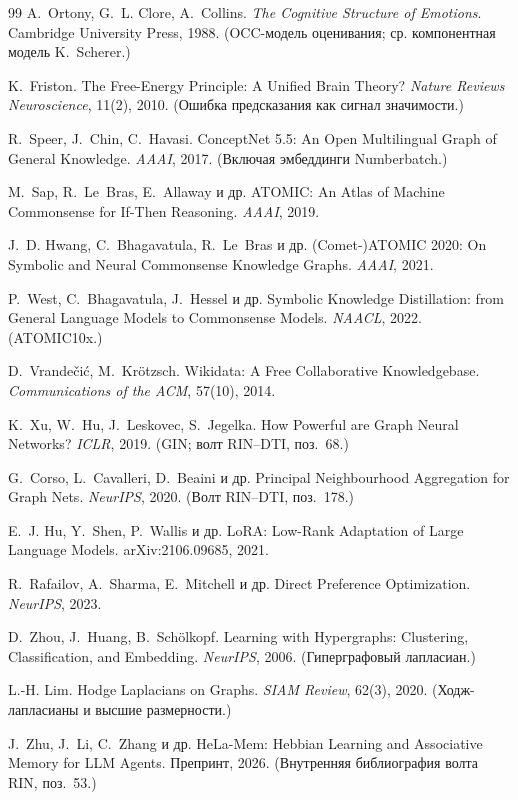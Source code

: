 \begin{thebibliography}{99}
 A.~Ortony, G.~L. Clore, A.~Collins.
\emph{The Cognitive Structure of Emotions}. Cambridge University Press, 1988.
(OCC-модель оценивания; ср. компонентная модель K.~Scherer.)

 K.~Friston. The Free-Energy Principle: A Unified Brain
Theory? \emph{Nature Reviews Neuroscience}, 11(2), 2010. (Ошибка предсказания как
сигнал значимости.)

 R.~Speer, J.~Chin, C.~Havasi.
ConceptNet 5.5: An Open Multilingual Graph of General Knowledge. \emph{AAAI},
2017. (Включая эмбеддинги Numberbatch.)

 M.~Sap, R.~Le~Bras, E.~Allaway и др.
ATOMIC: An Atlas of Machine Commonsense for If-Then Reasoning. \emph{AAAI}, 2019.

 J.~D. Hwang, C.~Bhagavatula, R.~Le~Bras и др.
(Comet-)ATOMIC 2020: On Symbolic and Neural Commonsense Knowledge Graphs.
\emph{AAAI}, 2021.

 P.~West, C.~Bhagavatula, J.~Hessel и др.
Symbolic Knowledge Distillation: from General Language Models to Commonsense
Models. \emph{NAACL}, 2022. (ATOMIC10x.)

 D.~Vrande\v{c}i\'c, M.~Kr\"otzsch.
Wikidata: A Free Collaborative Knowledgebase. \emph{Communications of the ACM},
57(10), 2014.

 K.~Xu, W.~Hu, J.~Leskovec, S.~Jegelka.
How Powerful are Graph Neural Networks? \emph{ICLR}, 2019. (GIN; волт RIN–DTI,
поз.~68.)

 G.~Corso, L.~Cavalleri, D.~Beaini и др.
Principal Neighbourhood Aggregation for Graph Nets. \emph{NeurIPS}, 2020.
(Волт RIN–DTI, поз.~178.)

 E.~J. Hu, Y.~Shen, P.~Wallis и др.
LoRA: Low-Rank Adaptation of Large Language Models. arXiv:2106.09685, 2021.

 R.~Rafailov, A.~Sharma, E.~Mitchell и др.
Direct Preference Optimization. \emph{NeurIPS}, 2023.

 D.~Zhou, J.~Huang, B.~Sch\"olkopf.
Learning with Hypergraphs: Clustering, Classification, and Embedding.
\emph{NeurIPS}, 2006. (Гиперграфовый лапласиан.)

 L.-H. Lim. Hodge Laplacians on Graphs.
\emph{SIAM Review}, 62(3), 2020. (Ходж-лапласианы и высшие размерности.)

 J.~Zhu, J.~Li, C.~Zhang и др.
HeLa-Mem: Hebbian Learning and Associative Memory for LLM Agents. Препринт, 2026.
(Внутренняя библиография волта RIN, поз.~53.)


\end{thebibliography}
